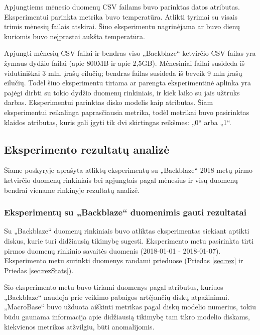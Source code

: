 \documentclass{VUMIFPSkursinis}
\begin{document}
Apjungtiems mėnesio duomenų CSV failams buvo parinktas datos atributas. Eksperimentui parinkta metrika buvo temperatūra. Atlikti tyrimai su visais trimis mėnesių failais atskirai. Šiuo eksperimentu nagrinėjama ar buvo dienų kuriomis buvo neįprastai aukšta temperatūra.


Apjungti mėnesių CSV failai ir bendras viso „Backblaze“ ketvirčio CSV failas yra žymaus dydžio failai (apie 800MB ir apie 2,5GB). Mėnesiniai failai susideda iš vidutiniškai 3 mln. įrašų eilučių; bendras failas susideda iš beveik 9 mln įrašų eilučių. Todėl šiuo eksperimentu tiriama ar parengta eksperimentinė aplinka yra pajėgi dirbti su tokio dydžio duomenų rinkiniais, ir kiek laiko su jais užtruks darbas. Eksperimentui parinktas disko modelis kaip atributas. Šiam eksperimentui reikalinga paprasčiausia metrika, todėl metrikai buvo pasirinktas klaidos atributas, kuris gali įgyti tik dvi skirtingas reikšmes: „0“ arba „1“.

\subsection{Eksperimento rezultatų analizė}
Šiame poskyryje aprašyta atliktų eksperimentų su „Backblaze“ 2018 metų pirmo ketvirčio duomenų rinkiniais bei apjungtais pagal mėnesius ir visų duomenų bendrai viename rinkinyje rezultatų analizė.

\subsubsection{Eksperimentų su „Backblaze“ duomenimis gauti rezultatai}
Su „Backblaze“ duomenų rinkiniais buvo atliktas eksperimentas siekiant aptikti diskus, kurie turi didžiausią tikimybę sugesti. Eksperimento metu pasirinkta tirti pirmos duomenų rinkinio savaitės duomenis (2018-01-01 - 2018-01-07). Eksperimento metu surinkti duomenys randami prieduose (Priedas \ref{sec:rez} ir Priedas \ref{sec:rezStats}).\par
Šio eksperimento metu buvo tiriami duomenys pagal atributus, kuriuos „Backblaze“ naudoja prie veikimo pabaigos artėjančių diskų atpažinimui. „MacroBase“ buvo užduota aiškinti metrikas pagal diskų modelio numerius, tokiu būdu gaunama informacija apie didžiausią tikimybę tam tikro modelio diskams, kiekvienos metrikos atžvilgiu, būti anomalijomis.\par
\end{document}
